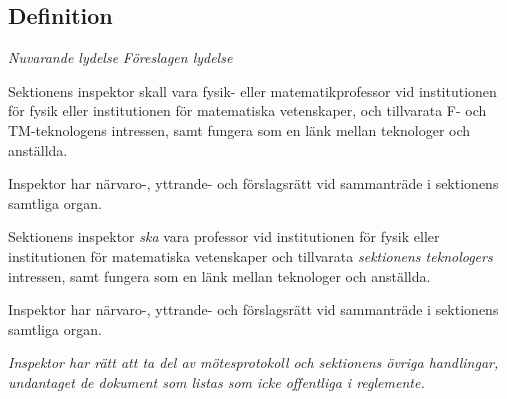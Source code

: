 \documentclass{article}
\newenvironment{lydelse}
    {\begin{paracol}{2}%
        \emph{Nuvarande lydelse}%
        \switchcolumn%
        \emph{Föreslagen lydelse}%
    \end{paracol}%
    \begin{enumerate}[label=\thesubsection.\arabic*]%
    \begin{paracol}{2}%
    }{\end{paracol}\end{enumerate}}
\newcommand{\itemb}{\item[\textbullet]}
\begin{document}
\subsection{Definition}
\begin{lydelse}
    \itemb Sektionens inspektor skall vara fysik- eller matematikprofessor vid institutionen för fysik eller institutionen för matematiska vetenskaper, och tillvarata F- och TM-teknologens intressen, samt fungera som en länk mellan teknologer och anställda.

    \itemb Inspektor har närvaro-, yttrande- och förslagsrätt vid sammanträde i sektionens samtliga organ.
    
  \switchcolumn
  \setcounter{enumi}{0}
    
    \item Sektionens inspektor \emph{ska} vara professor vid institutionen för fysik eller institutionen för matematiska vetenskaper och tillvarata \emph{sektionens teknologers} intressen, samt fungera som en länk mellan teknologer och anställda.

    \item Inspektor har närvaro-, yttrande- och förslagsrätt vid sammanträde i sektionens samtliga organ.
    
    \item \emph{Inspektor har rätt att ta del av mötesprotokoll och sektionens övriga handlingar, undantaget de dokument som listas som icke offentliga i reglemente.}
\end{lydelse}
\end{document}
